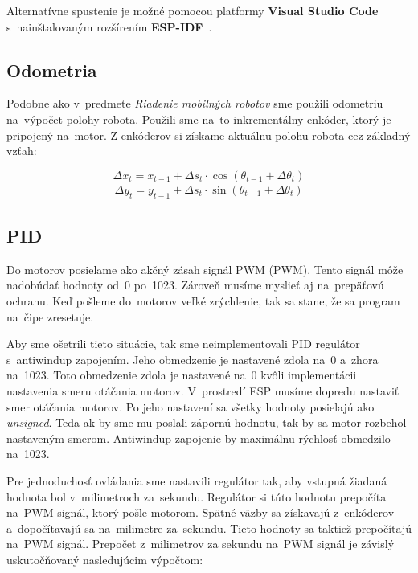 Alternatívne spustenie je možné pomocou platformy \textbf{Visual Studio Code} s~nainštalovaným rozšírením
\textbf{ESP-IDF}~\cite{espIDF}.

\subsection{Odometria}
\label{subsec:odometria}

Podobne ako v~predmete \textit{Riadenie mobilných robotov} sme použili odometriu na~výpočet polohy robota.
Použili sme na~to inkrementálny enkóder, ktorý je pripojený na~motor. Z enkóderov si získame aktuálnu polohu robota
cez základný vzťah:

\begin{equation}
	\label{eq:odometria}
	 \Delta x_t = x_{t-1} + \Delta s_t \cdot \cos(\theta_{t-1} + \Delta \theta_t)
\end{equation}
\begin{align*}
	\Delta y_t = y_{t-1} + \Delta s_t \cdot \sin(\theta_{t-1} + \Delta \theta_t)
\end{align*}

\newpage

\subsection{PID}
\label{subsec:pid}

Do motorov posielame ako akčný zásah signál PWM (\acrlong{PWM}). Tento signál môže nadobúdať hodnoty od~0 po~1023.
Zároveň musíme myslieť aj na~prepäťovú ochranu. Keď pošleme do~motorov veľké zrýchlenie, tak sa stane, že sa program
na~čipe zresetuje.

Aby sme ošetrili tieto situácie, tak sme neimplementovali PID regulátor s~antiwindup zapojením. Jeho obmedzenie je
nastavené zdola na~0 a~zhora na~1023. Toto obmedzenie zdola je nastavené na~0 kvôli implementácii nastavenia smeru
otáčania motorov. V~prostredí ESP musíme dopredu nastaviť smer otáčania motorov. Po jeho nastavení sa všetky hodnoty
posielajú ako \textit{unsigned}. Teda ak by sme mu poslali zápornú hodnotu, tak by sa motor rozbehol nastaveným smerom.
Antiwindup zapojenie by maximálnu rýchlosť obmedzilo na~1023.

Pre jednoduchosť ovládania sme nastavili regulátor tak, aby vstupná žiadaná hodnota bol v~milimetroch za~sekundu.
Regulátor si túto hodnotu prepočíta na~PWM signál, ktorý pošle motorom. Spätné väzby sa získavajú z~enkóderov
a~dopočítavajú sa na~milimetre za~sekundu. Tieto hodnoty sa taktiež prepočítajú na~PWM signál. Prepočet z~milimetrov
za sekundu na~PWM signál je závislý uskutočňovaný nasledujúcim výpočtom:

